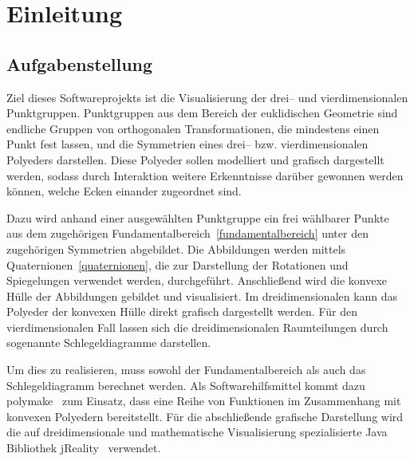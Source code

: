 \section{Einleitung}

\subsection{Aufgabenstellung}

    Ziel dieses Softwareprojekts ist die Visualisierung der drei-- und vierdimensionalen Punktgruppen. Punktgruppen aus dem Bereich der euklidischen Geometrie sind endliche Gruppen von orthogonalen Transformationen, die mindestens einen Punkt fest lassen, und die Symmetrien eines drei-- bzw. vierdimensionalen Polyeders darstellen. Diese Polyeder sollen modelliert und grafisch dargestellt werden, sodass durch Interaktion weitere Erkenntnisse darüber gewonnen werden können, welche Ecken einander zugeordnet sind.
    
    Dazu wird anhand einer ausgewählten Punktgruppe ein frei wählbarer Punkte aus dem zugehörigen Fundamentalbereich~\ref{fundamentalbereich} unter den zugehörigen Symmetrien abgebildet. Die Abbildungen werden mittels Quaternionen~\ref{quaternionen}, die zur Darstellung der Rotationen und Spiegelungen verwendet werden, durchgeführt. Anschließend wird die konvexe Hülle der Abbildungen gebildet und visualisiert. Im dreidimensionalen kann das Polyeder der konvexen Hülle direkt grafisch dargestellt werden. Für den vierdimensionalen Fall lassen sich die dreidimensionalen Raumteilungen durch sogenannte Schlegeldiagramme darstellen.
    
    Um dies zu realisieren, muss sowohl der Fundamentalbereich als auch das Schlegeldiagramm berechnet werden. Als Softwarehilfsmittel kommt dazu polymake~\cite{polymake} zum Einsatz, dass eine Reihe von Funktionen im Zusammenhang mit konvexen Polyedern bereitstellt. Für die abschließende grafische Darstellung wird die auf dreidimensionale und mathematische Visualisierung spezialisierte Java Bibliothek jReality~\cite{jreality} verwendet.